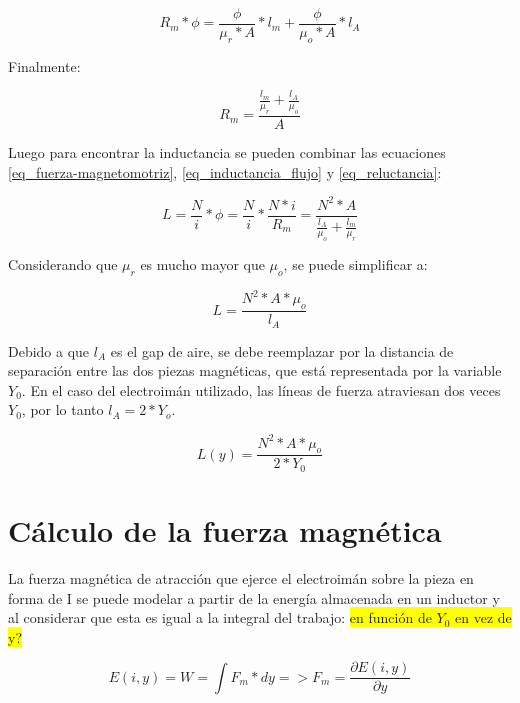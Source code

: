 \begin{equation}
		R_{m}*\phi=\frac{\phi}{\mu_{r}*A}*l_{m}+\frac{\phi}{\mu_{o}*A}*l_{A}
\end{equation}

\noindent Finalmente:

\begin{equation} \label{eq_reluctancia}
	R_{m}=\frac{\frac{l_{m}}{\mu_{r}}+\frac{l_{A}}{\mu_{o}}}{A}
\end{equation}

\noindent Luego para encontrar la inductancia se pueden combinar las ecuaciones  \ref{eq_fuerza-magnetomotriz}, \ref{eq_inductancia_flujo} y \ref{eq_reluctancia}:

\begin{equation}\label{eq_inductancia_2}
	L=\frac{N}{i}*\phi=\frac{N}{i}*\frac{N*i}{R_{m}}=\frac{N^{2}*A}{\frac{l_{A}}{\mu_{o}}+\frac{l_{m}}{\mu_{r}}}
\end{equation}

\noindent Considerando que $\mu_{r}$ es mucho mayor que $\mu_{o}$, se puede simplificar a:

\begin{equation} \label{eq_inductancia_gap}
	L=\frac{N^{2}*A*\mu_{o}}{l_{A}}
\end{equation}

\noindent \noindent Debido a que $l_{A}$ es el gap de aire, se debe reemplazar por la distancia de separación entre las dos piezas magnéticas, que está representada por la variable $Y_{0}$. En el caso del electroimán utilizado, las líneas de fuerza atraviesan dos veces $Y_{0}$, por lo tanto $l_{A}=2*Y_{o}$.


\begin{equation}\label{eq_inductancia_vs_y}
		L(y)=\frac{{N^{2}*A*\mu_{o}}}{2*Y_{0}}
\end{equation}

\section{Cálculo de la fuerza magnética}

\noindent La fuerza magnética de atracción que ejerce el electroimán sobre la pieza en forma de I se puede modelar a partir de la energía almacenada en un inductor y al considerar que esta es igual a la integral del trabajo:
\noindent
 \colorbox{yellow}{en función de $Y_0$ en vez de y?}

\begin{equation}\label{eq_energia}
	E(i,y)=W=\int{F_{m}*dy}=>F_{m}=\frac{\partial{E(i,y)}}{\partial{y}}
\end{equation}

